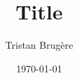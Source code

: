 \documentclass[a4paper,12pt]{article}
\title{Title}
\author{Tristan Brugère}
\date{\today}
\begin{document}
\maketitle{}
\tableofcontents{}
\pagebreak{}


\FloatBarrier{}
\printbibliography{}
\end{document}
